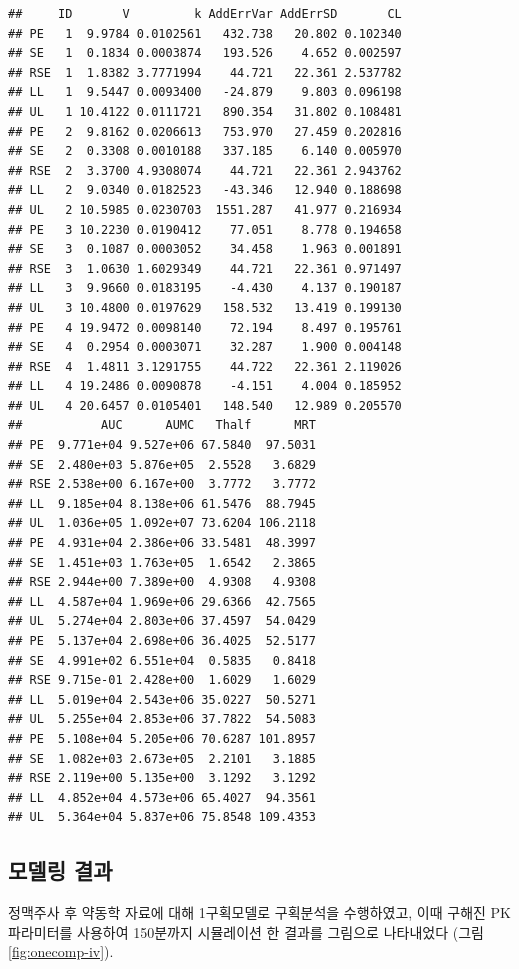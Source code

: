 \documentclass[
  11pt,
  krantz2, a4paper, twoside]{krantz}
\theoremstyle{definition}
\theoremstyle{definition}
\theoremstyle{definition}
\theoremstyle{definition}
\theoremstyle{remark}
\begin{document}
\begin{verbatim}
##     ID       V         k AddErrVar AddErrSD       CL
## PE   1  9.9784 0.0102561   432.738   20.802 0.102340
## SE   1  0.1834 0.0003874   193.526    4.652 0.002597
## RSE  1  1.8382 3.7771994    44.721   22.361 2.537782
## LL   1  9.5447 0.0093400   -24.879    9.803 0.096198
## UL   1 10.4122 0.0111721   890.354   31.802 0.108481
## PE   2  9.8162 0.0206613   753.970   27.459 0.202816
## SE   2  0.3308 0.0010188   337.185    6.140 0.005970
## RSE  2  3.3700 4.9308074    44.721   22.361 2.943762
## LL   2  9.0340 0.0182523   -43.346   12.940 0.188698
## UL   2 10.5985 0.0230703  1551.287   41.977 0.216934
## PE   3 10.2230 0.0190412    77.051    8.778 0.194658
## SE   3  0.1087 0.0003052    34.458    1.963 0.001891
## RSE  3  1.0630 1.6029349    44.721   22.361 0.971497
## LL   3  9.9660 0.0183195    -4.430    4.137 0.190187
## UL   3 10.4800 0.0197629   158.532   13.419 0.199130
## PE   4 19.9472 0.0098140    72.194    8.497 0.195761
## SE   4  0.2954 0.0003071    32.287    1.900 0.004148
## RSE  4  1.4811 3.1291755    44.722   22.361 2.119026
## LL   4 19.2486 0.0090878    -4.151    4.004 0.185952
## UL   4 20.6457 0.0105401   148.540   12.989 0.205570
##           AUC      AUMC   Thalf      MRT
## PE  9.771e+04 9.527e+06 67.5840  97.5031
## SE  2.480e+03 5.876e+05  2.5528   3.6829
## RSE 2.538e+00 6.167e+00  3.7772   3.7772
## LL  9.185e+04 8.138e+06 61.5476  88.7945
## UL  1.036e+05 1.092e+07 73.6204 106.2118
## PE  4.931e+04 2.386e+06 33.5481  48.3997
## SE  1.451e+03 1.763e+05  1.6542   2.3865
## RSE 2.944e+00 7.389e+00  4.9308   4.9308
## LL  4.587e+04 1.969e+06 29.6366  42.7565
## UL  5.274e+04 2.803e+06 37.4597  54.0429
## PE  5.137e+04 2.698e+06 36.4025  52.5177
## SE  4.991e+02 6.551e+04  0.5835   0.8418
## RSE 9.715e-01 2.428e+00  1.6029   1.6029
## LL  5.019e+04 2.543e+06 35.0227  50.5271
## UL  5.255e+04 2.853e+06 37.7822  54.5083
## PE  5.108e+04 5.205e+06 70.6287 101.8957
## SE  1.082e+03 2.673e+05  2.2101   3.1885
## RSE 2.119e+00 5.135e+00  3.1292   3.1292
## LL  4.852e+04 4.573e+06 65.4027  94.3561
## UL  5.364e+04 5.837e+06 75.8548 109.4353
\end{verbatim}

\subsection{모델링 결과}\label{uxbaa8uxb378uxb9c1-uxacb0uxacfc-1}

정맥주사 후 약동학 자료에 대해 1구획모델로 구획분석을 수행하였고, 이때 구해진 PK 파라미터를 사용하여 150분까지 시뮬레이션 한 결과를 그림으로 나타내었다 (그림 \ref{fig:onecomp-iv}). 
\end{document}
